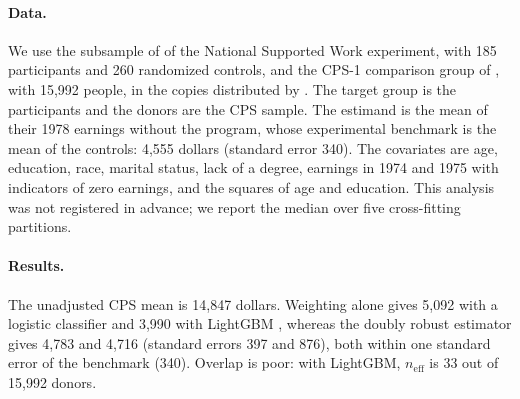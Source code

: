 \documentclass[twoside,11pt]{article}
\newcommand{\neff}{n_{\mathrm{eff}}}
\theoremstyle{plain}
\theoremstyle{definition}
\begin{document}
\paragraph{Data.} We use the subsample of \citet{dehejia1999} of the National Supported Work experiment, with 185 participants and 260 randomized controls, and the CPS-1 comparison group of \citet{lalonde1986}, with 15{,}992 people, in the copies distributed by \citet{cunningham2021}. The target group is the participants and the donors are the CPS sample. The estimand is the mean of their 1978 earnings without the program, whose experimental benchmark is the mean of the controls: 4{,}555 dollars (standard error 340). The covariates are age, education, race, marital status, lack of a degree, earnings in 1974 and 1975 with indicators of zero earnings, and the squares of age and education. This analysis was not registered in advance; we report the median over five cross-fitting partitions.

\paragraph{Results.} The unadjusted CPS mean is 14{,}847 dollars. Weighting alone gives 5{,}092 with a logistic classifier and 3{,}990 with LightGBM \citep{ke2017}, whereas the doubly robust estimator gives 4{,}783 and 4{,}716 (standard errors 397 and 876), both within one standard error of the benchmark (340). Overlap is poor: with LightGBM, $\neff$ is 33 out of 15{,}992 donors.
\end{document}
